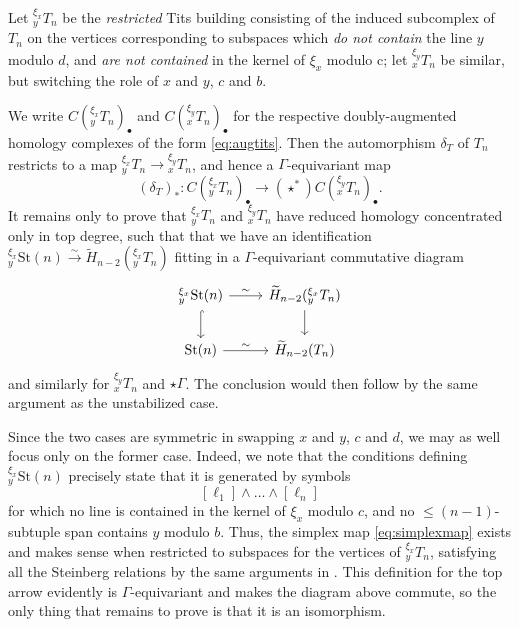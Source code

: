 \documentclass[10pt]{amsart}
\theoremstyle{definition}
\newcommand{\St}{\mathrm{St}}
\numberwithin{equation}{section}
\begin{document}
Let ${}^{\xi_x}_yT_n$ be the \emph{restricted} Tits building consisting of the induced subcomplex of $T_n$ on the vertices corresponding to subspaces which \emph{do not contain} the line $y$ modulo $d$, and \emph{are not contained} in the kernel of $\xi_x$ modulo c; let ${}^{\xi_y}_xT_n$ be similar, but switching the role of $x$ and $y$, $c$ and $b$. 

We write $C({}^{\xi_x}_yT_n)_\bullet$ and $C({}^{\xi_y}_xT_n)_\bullet$ for the respective doubly-augmented homology complexes of the form \eqref{eq:augtits}. Then the automorphism $\delta_T$ of $T_n$ restricts to a map ${}^{\xi_x}_yT_n\to {}^{\xi_y}_xT_n$, and hence a $\Gamma$-equivariant map 
\[
(\delta_T)_*:C({}^{\xi_x}_yT_n)_\bullet \to (\star^*)C({}^{\xi_y}_xT_n)_\bullet. 
\]
It remains only to prove that ${}^{\xi_x}_yT_n$ and ${}^{\xi_y}_xT_n$ have reduced homology concentrated only in top degree, such that that we have an identification ${}^{\xi_x}_y\St(n) \xrightarrow{\sim} \widetilde{H}_{n-2}({}^{\xi_x}_yT_n)$ fitting in a $\Gamma$-equivariant commutative diagram 
\begin{equation}
    \begin{tikzcd}
        {}^{\xi_x}_y\St(n) \arrow[r, "\sim"] \arrow[hookrightarrow]{d} & \widetilde{H}_{n-2}({}^{\xi_x}_yT_n) \arrow[d] \\
        \St(n) \arrow[r, "\sim"] & \widetilde{H}_{n-2}(T_n)
    \end{tikzcd}
\end{equation}
and similarly for ${}^{\xi_y}_xT_n$ and $\star\Gamma$. The conclusion would then follow by the same argument as the unstabilized case.

Since the two cases are symmetric in swapping $x$ and $y$, $c$ and $d$, we may as well focus only on the former case. Indeed, we note that the conditions defining ${}^{\xi_x}_y\St(n)$ precisely state that it is generated by symbols 
\[
[\ell_1]\wedge \ldots \wedge [\ell_n]
\]
for which no line is contained in the kernel of $\xi_x$ modulo $c$, and no $\le (n-1)$-subtuple span contains $y$ modulo $b$. Thus, the simplex map \eqref{eq:simplexmap} exists and makes sense when restricted to subspaces for the vertices of ${}^{\xi_x}_yT_n$, satisfying all the Steinberg relations by the same arguments in \cite{AR}. This definition for the top arrow evidently is $\Gamma$-equivariant and makes the diagram above commute, so the only thing that remains to prove is that it is an isomorphism. 
\end{document}

